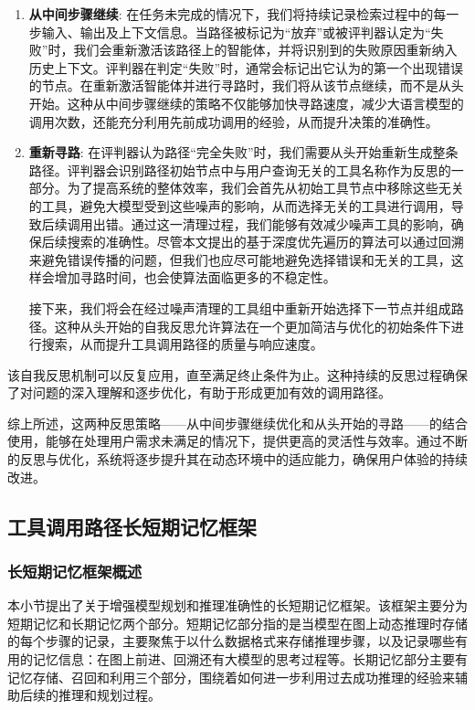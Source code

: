 \begin{enumerate}
  \item \textbf{从中间步骤继续}: 在任务未完成的情况下，我们将持续记录检索过程中的每一步输入、输出及上下文信息。当路径被标记为“放弃”或被评判器认定为“失败”时，我们会重新激活该路径上的智能体，并将识别到的失败原因重新纳入历史上下文。评判器在判定“失败”时，通常会标记出它认为的第一个出现错误的节点。在重新激活智能体并进行寻路时，我们将从该节点继续，而不是从头开始。这种从中间步骤继续的策略不仅能够加快寻路速度，减少大语言模型的调用次数，还能充分利用先前成功调用的经验，从而提升决策的准确性。
  \item \textbf{重新寻路}: 在评判器认为路径“完全失败”时，我们需要从头开始重新生成整条路径。评判器会识别路径初始节点中与用户查询无关的工具名称作为反思的一部分。为了提高系统的整体效率，我们会首先从初始工具节点中移除这些无关的工具，避免大模型受到这些噪声的影响，从而选择无关的工具进行调用，导致后续调用出错。通过这一清理过程，我们能够有效减少噪声工具的影响，确保后续搜索的准确性。尽管本文提出的基于深度优先遍历的算法可以通过回溯来避免错误传播的问题，但我们也应尽可能地避免选择错误和无关的工具，这样会增加寻路时间，也会使算法面临更多的不稳定性。\par
    接下来，我们将会在经过噪声清理的工具组中重新开始选择下一节点并组成路径。这种从头开始的自我反思允许算法在一个更加简洁与优化的初始条件下进行搜索，从而提升工具调用路径的质量与响应速度。
\end{enumerate}
 
该自我反思机制可以反复应用，直至满足终止条件为止。这种持续的反思过程确保了对问题的深入理解和逐步优化，有助于形成更加有效的调用路径。

综上所述，这两种反思策略——从中间步骤继续优化和从头开始的寻路——的结合使用，能够在处理用户需求未满足的情况下，提供更高的灵活性与效率。通过不断的反思与优化，系统将逐步提升其在动态环境中的适应能力，确保用户体验的持续改进。

\subsection{工具调用路径长短期记忆框架}

\subsubsection{长短期记忆框架概述}

本小节提出了关于增强模型规划和推理准确性的长短期记忆框架。该框架主要分为短期记忆和长期记忆两个部分。短期记忆部分指的是当模型在图上动态推理时存储的每个步骤的记录，主要聚焦于以什么数据格式来存储推理步骤，以及记录哪些有用的记忆信息：在图上前进、回溯还有大模型的思考过程等。长期记忆部分主要有记忆存储、召回和利用三个部分，围绕着如何进一步利用过去成功推理的经验来辅助后续的推理和规划过程。

